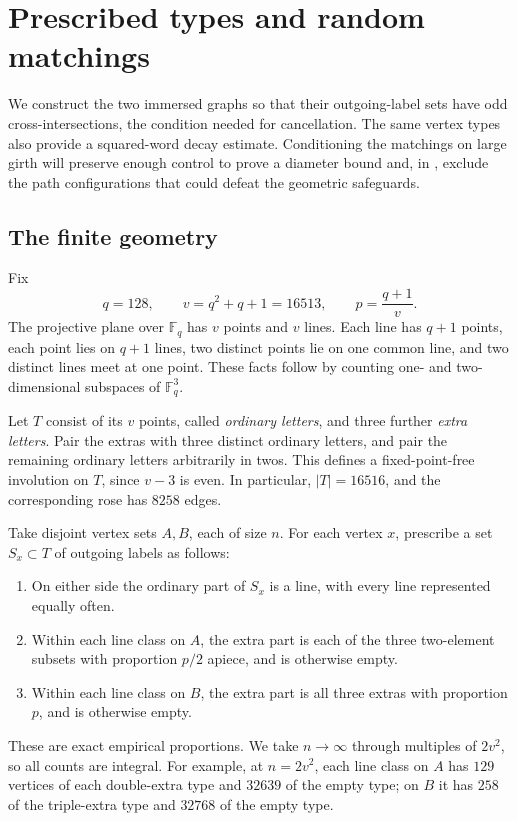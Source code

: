 \section{Prescribed types and random matchings}\label{sec:types}

We construct the two immersed graphs so that their outgoing-label sets
have odd cross-intersections, the condition needed for cancellation.
The same vertex types also provide a squared-word decay estimate.
Conditioning the matchings on large girth will preserve enough control
to prove a diameter bound and, in , exclude
the path configurations that could defeat the geometric safeguards.

\subsection{The finite geometry}

Fix
\[
q=128,\qquad v=q^2+q+1=16513,\qquad p=\frac{q+1}{v}.
\]
The projective plane over \(\mathbb F_q\) has \(v\) points and \(v\) lines. Each line has \(q+1\) points, each point lies on \(q+1\) lines, two distinct points lie on one common line, and two distinct lines meet at one point. These facts follow by counting one- and two-dimensional subspaces of \(\mathbb F_q^3\).

Let \(T\) consist of its \(v\) points, called \emph{ordinary letters}, and three further \emph{extra letters}. Pair the extras with three distinct ordinary letters, and pair the remaining ordinary letters arbitrarily in twos. This defines a fixed-point-free involution on \(T\), since \(v-3\) is even. In particular, \(|T|=16516\), and the corresponding rose has \(8258\) edges.

Take disjoint vertex sets \(A,B\), each of size \(n\). For each vertex \(x\), prescribe a set \(S_x\subset T\) of outgoing labels as follows:
\begin{enumerate}
\item On either side the ordinary part of \(S_x\) is a line, with every line represented equally often.
\item Within each line class on \(A\), the extra part is each of the three two-element subsets with proportion \(p/2\) apiece, and is otherwise empty.
\item Within each line class on \(B\), the extra part is all three extras with proportion \(p\), and is otherwise empty.
\end{enumerate}
These are exact empirical proportions. We take \(n\to\infty\) through multiples of \(2v^2\), so all counts are integral. For example, at \(n=2v^2\), each line class on \(A\) has \(129\) vertices of each double-extra type and \(32639\) of the empty type; on \(B\) it has \(258\) of the triple-extra type and \(32768\) of the empty type.

